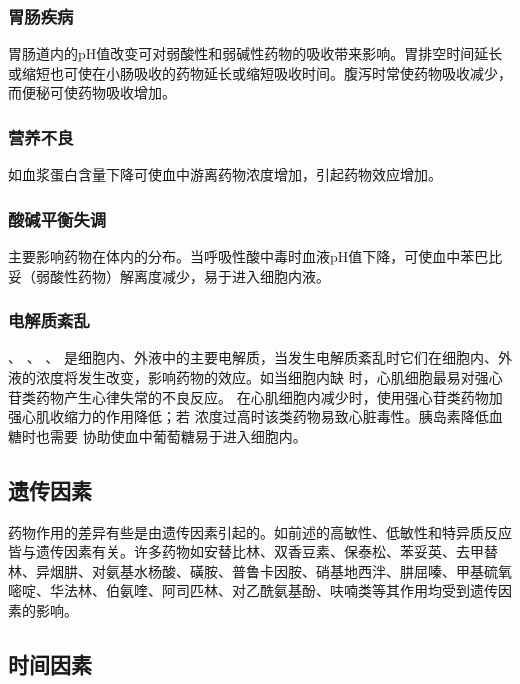 \subsubsection{胃肠疾病}

胃肠道内的pH值改变可对弱酸性和弱碱性药物的吸收带来影响。胃排空时间延长或缩短也可使在小肠吸收的药物延长或缩短吸收时间。腹泻时常使药物吸收减少，而便秘可使药物吸收增加。

\subsubsection{营养不良}

如血浆蛋白含量下降可使血中游离药物浓度增加，引起药物效应增加。

\subsubsection{酸碱平衡失调}

主要影响药物在体内的分布。当呼吸性酸中毒时血液pH值下降，可使血中苯巴比妥（弱酸性药物）解离度减少，易于进入细胞内液。

\subsubsection{电解质紊乱}

 、 、 、
是细胞内、外液中的主要电解质，当发生电解质紊乱时它们在细胞内、外液的浓度将发生改变，影响药物的效应。如当细胞内缺
时，心肌细胞最易对强心苷类药物产生心律失常的不良反应。
在心肌细胞内减少时，使用强心苷类药物加强心肌收缩力的作用降低；若
浓度过高时该类药物易致心脏毒性。胰岛素降低血糖时也需要
协助使血中葡萄糖易于进入细胞内。

\subsection{遗传因素}

药物作用的差异有些是由遗传因素引起的。如前述的高敏性、低敏性和特异质反应皆与遗传因素有关。许多药物如安替比林、双香豆素、保泰松、苯妥英、去甲替林、异烟肼、对氨基水杨酸、磺胺、普鲁卡因胺、硝基地西泮、肼屈嗪、甲基硫氧嘧啶、华法林、伯氨喹、阿司匹林、对乙酰氨基酚、呋喃类等其作用均受到遗传因素的影响。

\subsection{时间因素}

